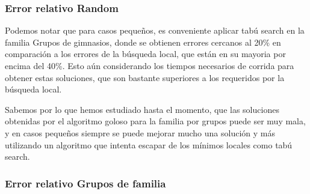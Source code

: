 \subsubsection*{Error relativo Random}

\begin{figure}[h] 
 \centering
       \label{fig:randomDist1}
    \label{fig:randomMejora1}
\end{figure}

Podemos notar que para casos pequeños, es conveniente aplicar tabú search en la familia Grupos de gimnasios, donde  se obtienen errores cercanos al 20\% en comparación a los errores de la búsqueda local, que están en su mayoria por encima del 40\%. Esto aún considerando los tiempos necesarios de corrida para obtener estas soluciones, que son bastante superiores a los requeridos por la búsqueda local. 

Sabemos por lo que hemos estudiado hasta el momento, que las soluciones obtenidas por el algoritmo goloso para la familia por grupos puede ser muy mala, y en casos pequeños siempre se puede mejorar mucho una solución y más utilizando un algoritmo que intenta escapar de los mínimos locales como tabú search.\\

\subsubsection*{Error relativo Grupos de familia}

